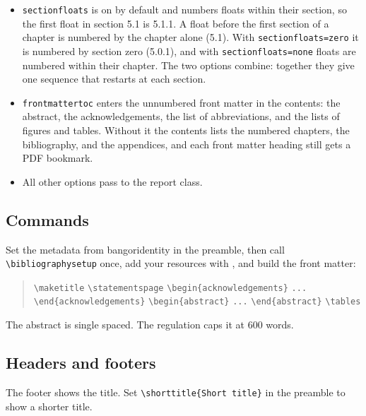 \documentclass[a4paper,12pt]{article}
\begin{document}
\begin{itemize}
        listings, and algorithms on one counter, so the sequence reads
        Figure 1, Table 2, Listing 3. \verb|sharedfloats=false| gives each
        type its own counter. Listings and algorithms take part when their
        packages are loaded.
  \item \verb|sectionfloats| is on by default and numbers floats within
        their section, so the first float in section 5.1 is 5.1.1. A float
        before the first section of a chapter is numbered by the chapter
        alone (5.1). With \verb|sectionfloats=zero| it is numbered by
        section zero (5.0.1), and with \verb|sectionfloats=none| floats are
        numbered within their chapter. The two options combine: together
        they give one sequence that restarts at each section.
  \item \verb|frontmattertoc| enters the unnumbered front matter in the
        contents: the abstract, the acknowledgements, the list of
        abbreviations, and the lists of figures and tables. Without it the
        contents lists the numbered chapters, the bibliography, and the
        appendices, and each front matter heading still gets a PDF bookmark.
  \item All other options pass to the \textsf{report} class.
\end{itemize}

\subsection{Commands}
Set the metadata from \textsf{bangoridentity} in the preamble, then
call \verb|\bibliographysetup| once, add your resources with
\verb||, and build the front matter:

\begin{quote}
  \verb|\maketitle| \quad \verb|\statementspage| \quad
  \verb|\begin{acknowledgements}| \verb|...| \verb|\end{acknowledgements}|
  \quad \verb|\begin{abstract}| \verb|...| \verb|\end{abstract}| \quad
  \verb|\tables|
\end{quote}

The abstract is single spaced. The regulation caps it at 600 words.

\subsection{Headers and footers}
The footer shows the title. Set \verb|\shorttitle{Short title}| in the
preamble to show a shorter title.
\end{document}
